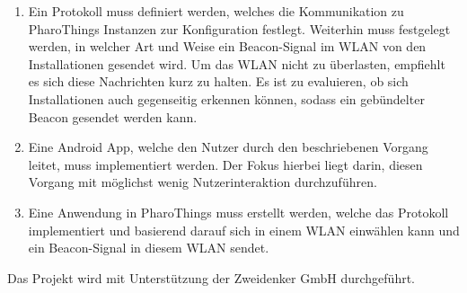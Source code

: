     \begin{enumerate}
        \item Ein Protokoll muss definiert werden, welches die Kommunikation zu PharoThings Instanzen zur Konfiguration festlegt.
        Weiterhin muss festgelegt werden, in welcher Art und Weise ein Beacon-Signal im WLAN von den Installationen gesendet wird.
        Um das WLAN nicht zu überlasten, empfiehlt es sich diese Nachrichten kurz zu halten. Es ist zu evaluieren,
        ob sich Installationen auch gegenseitig erkennen können, sodass ein gebündelter Beacon gesendet werden kann.
        \item Eine Android App, welche den Nutzer durch den beschriebenen Vorgang leitet, muss implementiert werden.
        Der Fokus hierbei liegt darin, diesen Vorgang mit möglichst wenig Nutzerinteraktion durchzuführen.
        \item Eine Anwendung in PharoThings muss erstellt werden, welche das Protokoll implementiert
        und basierend darauf sich in einem WLAN einwählen kann und ein Beacon-Signal in diesem WLAN sendet.
    \end{enumerate}
    Das Projekt wird mit Unterstützung der Zweidenker GmbH durchgeführt.